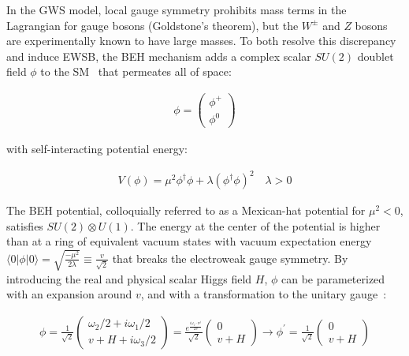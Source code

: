 In the GWS model, local gauge symmetry prohibits mass terms in the Lagrangian for gauge bosons (Goldstone's theorem), but the $W^\pm$ and $Z$ bosons are experimentally known to have large masses.
To both resolve this discrepancy and induce EWSB, the BEH mechanism adds a complex scalar $SU(2)$ doublet field $\phi$ to the SM~\cite{nagashima_2013_V2} that permeates all of space:
\begin{linenomath*}
\begin{align}
\phi=\left(\begin{array}{l}
\phi^{+} \\
\phi^0
\end{array}\right)
\end{align}
\end{linenomath*}
with self-interacting potential energy:
\begin{linenomath*}
\begin{align}
V(\phi) = \mu^2 \phi^{\dagger} \phi + \lambda\left(\phi^{\dagger} \phi\right)^2 \quad \lambda >0
\end{align}
\end{linenomath*}
The BEH potential, colloquially referred to as a Mexican-hat potential for $\mu^2 < 0$, satisfies $SU(2) \otimes U(1)$.
The energy at the center of the potential is higher than at a ring of equivalent vacuum states with vacuum expectation energy $\langle 0 \vert \phi \vert 0 \rangle=\sqrt{\frac{-\mu^2}{2 \lambda}} \equiv \frac{v}{\sqrt{2}}$ that breaks the electroweak gauge symmetry.
By introducing the real and physical scalar Higgs field $H$, $\phi$ can be parameterized with an expansion around $v$, and with a transformation to the unitary gauge~\cite{nagashima_2013_V2}:
\begin{linenomath*}
\begin{align}
\phi
=\frac{1}{\sqrt{2}}
\left(\begin{array}{l}
\omega_2/2 + i \omega_1/2 \\
v + H + i \omega_3/2
\end{array}\right)
= \frac{e^{\frac{ i \omega_j \cdot \sigma^j}{2v}}}{\sqrt{2}}
\left(\begin{array}{c}
0 \\
v+H
\end{array}\right)
\longrightarrow \phi^{\prime} = \frac{1}{\sqrt{2}}
\left(\begin{array}{c}
0 \\
v+H
\end{array}\right)
\end{align}
\end{linenomath*}
